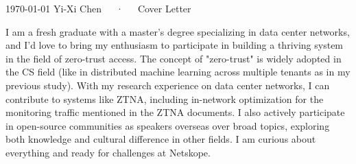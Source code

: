\documentclass[11pt, a4paper]{awesome-cv}
\begin{document}
\makecvheader[L]

\makecvfooter
  {\today}
  {Yi-Xi Chen~~~·~~~Cover Letter}
  {}

\makelettertitle

\begin{cvletter}


I am a fresh graduate with a master's degree specializing in data center networks, and I'd love to bring my enthusiasm 
to participate in building a thriving system in the field of zero-trust access. 
The concept of "zero-trust" is widely adopted in the CS field (like in distributed machine learning across multiple 
tenants as in my previous study). With my research experience on data center networks, I can contribute to systems
 like ZTNA, including in-network optimization for the monitoring traffic mentioned in the ZTNA documents.
I also actively participate in open-source communities as speakers overseas over broad topics, exploring both 
knowledge and cultural difference in other fields. I am curious about everything and ready for challenges at Netskope.

\end{cvletter}


\makeletterclosing
\end{document}

